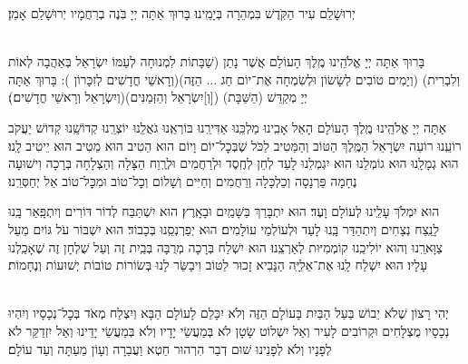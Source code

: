 \documentclass[twoside, openany, parskip=half, 11pt]{book}
\begin{document}
\begin{small}
\begin{sometimes}
\end{sometimes}

יְרוּשָׁלַ‍ִם עִיר הַקֹּֽדֶשׁ בִּמְהֵרָה בְּיָמֵֽינוּ׃ בָּרוּךְ אַתָּה יְיָ בֹּֽנֶה בְרַחֲמָיו יְרוּשָׁלַ‍ִם אָמֵן׃

\begin{sometimes}

\\
בָּרוּךְ אַתָּה יְיָ אֱלֹהֵֽינוּ מֶֽלֶךְ הָעוֹלָם אֲשֶׁר נָתַן (שַׁבָּתוֹת לִמְנוּחָה לְעַמּוֹ יִשְׂרָאֵל בְּאַהֲבָה לְאוֹת וְלִבְרִית)
(וְיָמִים טוֹבִים לְשָׂשׂוֹן וּלְשִׂמְחָה אֶת־יוֹם חַג ... הַזֶּה)(וְרָאשֵׁי חֳדָשִׁים לְזִכָּרוֹן ):
בָּרוּךְ אַתָּה יְיָ מְקַדֵּשׁ (הַשַּׁבָּת) ([וְ]יִשְׂרָאֵל וְהַזְּמַנִּים)(וְיִשְׂרָאֵל וְרָאשֵׁי חֳדָשִׁים׃)׃

\end{sometimes}


אַתָּה יְיָ אֱלֹהֵֽינוּ מֶֽלֶךְ הָעוֹלָם הָאֵל אָבִֽינוּ מַלְכֵּֽנוּ אַדִּירֵֽנוּ בּוֹרְאֵֽנוּ גֹאֲלֵֽנוּ יוֹצְרֵֽנוּ קְדוֹשֵֽׁנוּ קְדוֹשׁ יַעֲקֹב רוֹעֵֽנוּ רוֹעֵה יִשְׂרָאֵל הַמֶּֽלֶךְ הַטּוֹב וְהַמֵּטִיב לַכֹּל שֶׁבְּכׇל־יוֹם וָיוֹם הוּא הֵטִיב הוּא מֵטִיב הוּא יֵיטִיב לָֽנוּ׃ הוּא גְמָלָֽנוּ הוּא גוֹמְלֵנוּ הוּא יִגְמְלֵנוּ לָעַד לְחֵן לְחֶֽסֶד וּלְרַחֲמִים וּלְרֶֽוַח הַצָּלָה וְהַצְלָחָה בְּרָכָה וִישׁוּעָה נֶחָמָה פַּרְנָסָה וְכַלְכָּלָה וְרַחֲמִים וְחַיִּים וְשָׁלוֹם וְכׇל־טוֹב וּמִכׇּל־טוֹב אַל יְחַסְּרֵֽנוּ׃

הוּא יִמְלֹךְ עָלֵֽינוּ לְעוֹלָם וָעֶד׃
הוּא יִתְבָּרַךְ בַּשָּׁמַֽיִם וּבָאָֽרֶץ׃
הוּא יִשְׁתַּבַּח לְדוֹר דּוֹרִים וְיִתְפָּֽאַר בָּֽנוּ לָנֵֽצַח נְצָחִים
וְיִתְהַדַּר בָּֽנוּ לָעַד וּלְעוֹלְמֵי עוֹלָמִים׃
הוּא יְפַרְנְסֵֽנוּ בְּכָבוֹד׃
הוּא יִשְׁבּוֹר עֹל גּוֹיִם מֵעַל צַוָּארֵֽנוּ וְהוּא יוֹלִיכֵֽנוּ קוֹמְמִיּוּת לְאַרְצֵֽנוּ׃
הוּא יִשְׁלַח בְּרָכָה מְרֻבָּה בְּבַֽיִת זֶה וְעַל שֻׁלְחָן זֶה שֶׁאָכַֽלְנוּ עָלָיו׃
הוּא יִשְׁלַח לָֽנוּ אֶת־אֵלִיָּֽה הַנָּבִיא זָכוּר לַטּוֹב וִיבַשֵּׂר לָנוּ בְּשׂוֹרוֹת טוֹבוֹת יְשׁוּעוֹת וְנֶחָמוֹת׃


\begin{footnotesize}
\\
יְהִי רָצוֹן שֶׁלֹא יֵבוֹשׁ בַּעַל הַבַּיִת בָּעוֹלָם הַזֶּה וְלֹא יִכָּלֵם לָעוֹלָם הַבָּא וְיִצְלַח מְאֹד בְּכׇל־נְכָסָיו וְיִהְיוּ נְכָסָיו מֻצְלָחִים וּקְרוֹבִים לָעִיר וְאַל יִשְׁלוֹט שָׂטָן לֹא בְּמַעֲשֵׂי יָדָיו וְלֹא בְּמַעֲשֵׂי יָדֵינוּ וְאַל יִזְדַקֵּר לֹא לְפָנָיו וְלֹא לְפָנֵינוּ שׁוּם דְבַר הִרְהוּר חֵטְא וַעֲבֵרָה וְעָוֹן מֵעַתָּה וְעַד עוֹלָם׃


\end{footnotesize}
\end{small}
\end{document}
